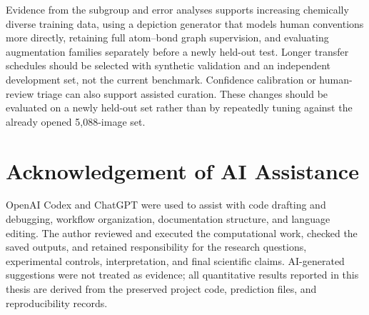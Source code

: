 \documentclass[11pt,a4paper]{article}
\begin{document}
Evidence from the subgroup and error analyses supports increasing chemically diverse training
data, using a depiction generator that models human conventions more directly, retaining full
atom--bond graph supervision, and evaluating
augmentation families separately before a newly held-out test. Longer transfer schedules should
be selected with synthetic validation and an independent development set, not the current
benchmark. Confidence calibration or human-review triage can also support assisted curation.
These changes should be evaluated on a newly held-out set rather than by repeatedly tuning against
the already opened 5,088-image set.

\section*{Acknowledgement of AI Assistance}

OpenAI Codex and ChatGPT were used to assist with code drafting and debugging, workflow
organization, documentation structure, and language editing. The author reviewed and executed
the computational work, checked the saved outputs, and retained responsibility for the research
questions, experimental controls, interpretation, and final scientific claims. AI-generated
suggestions were not treated as evidence; all quantitative results reported in this thesis are
derived from the preserved project code, prediction files, and reproducibility records.
\end{document}
